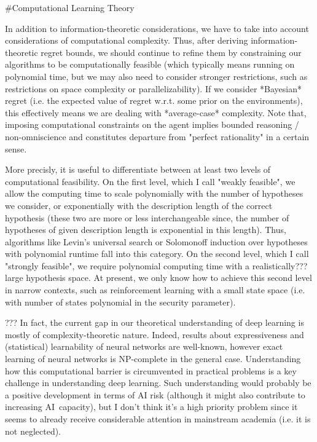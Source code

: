 \documentclass[a4paper]{article}
\begin{document}
\#Computational Learning Theory

In addition to information-theoretic considerations, we have to take into account considerations of computational complexity. Thus, after deriving information-theoretic regret bounds, we should continue to refine them by constraining our algorithms to be computationally feasible (which typically means running on polynomial time, but we may also need to consider stronger restrictions, such as restrictions on space complexity or parallelizability). If we consider *Bayesian* regret (i.e. the expected value of regret w.r.t. some prior on the environments), this effectively means we are dealing with *average-case* complexity. Note that, imposing computational constraints on the agent implies bounded reasoning / non-omniscience and constitutes departure from "perfect rationality" in a certain sense.

More precisly, it is useful to differentiate between at least two levels of computational feasibility. On the first level, which I call "weakly feasible", we allow the computing time to scale polynomially with the number of hypotheses we consider, or exponentially with the description length of the correct hypothesis (these two are more or less interchangeable since, the number of hypotheses of given description length is exponential in this length). Thus, algorithms like Levin's universal search or Solomonoff induction over hypotheses with polynomial runtime fall into this category. On the second level, which I call "strongly feasible", we require polynomial computing time with a realistically??? large hypothesis space. At present, we only know how to achieve this second level in narrow contexts, such as reinforcement learning with a small state space (i.e. with number of states polynomial in the security parameter).

??? In fact, the current gap in our theoretical understanding of deep learning is mostly of complexity-theoretic nature. Indeed, results about expressiveness and (statistical) learnability of neural networks are well-known, however exact learning of neural networks is NP-complete in the general case. Understanding how this computational barrier is circumvented in practical problems is a key challenge in understanding deep learning. Such understanding would probably be a positive development in terms of AI risk (although it might also contribute to increasing AI\ capacity), but I don't think it's a high priority problem since it seems to already receive considerable attention in mainstream academia (i.e. it is not neglected).
\end{document}
